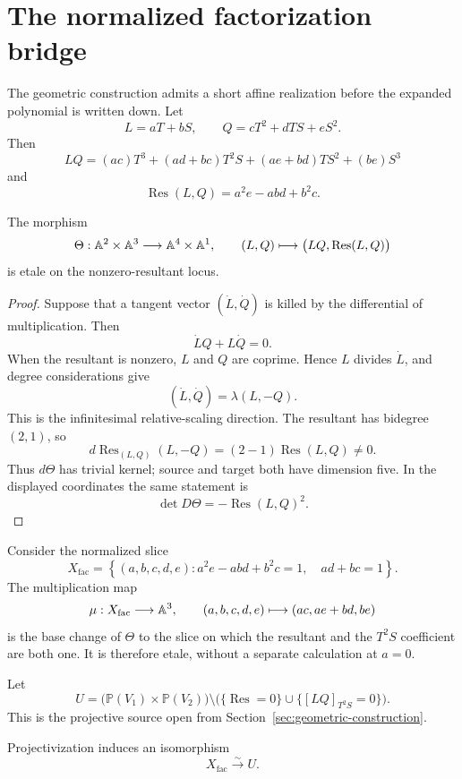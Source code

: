 \section{The normalized factorization bridge}\label{sec:factorization-bridge}

The geometric construction admits a short affine realization before the
expanded polynomial is written down.  Let
\[
 L=aT+bS,
 \qquad
 Q=cT^2+dTS+eS^2.
\]
Then
\[
 LQ=(ac)T^3+(ad+bc)T^2S+(ae+bd)TS^2+(be)S^3
\]
and
\[
 \operatorname{Res}(L,Q)=a^2e-abd+b^2c.
\]

\begin{proposition}
The morphism
\[
 \Theta:\mathbb A^2\times\mathbb A^3\longrightarrow\mathbb A^4\times\mathbb A^1,
 \qquad
 (L,Q)\longmapsto\bigl(LQ,\operatorname{Res}(L,Q)\bigr)
\]
is etale on the nonzero-resultant locus.
\end{proposition}

\begin{proof}
Suppose that a tangent vector $(\dot L,\dot Q)$ is killed by the differential
of multiplication.  Then
\[
 \dot LQ+L\dot Q=0.
\]
When the resultant is nonzero, $L$ and $Q$ are coprime.  Hence $L$ divides
$\dot L$, and degree considerations give
\[
 (\dot L,\dot Q)=\lambda(L,-Q).
\]
This is the infinitesimal relative-scaling direction.  The resultant has
bidegree $(2,1)$, so
\[
 d\operatorname{Res}_{(L,Q)}(L,-Q)
 =(2-1)\operatorname{Res}(L,Q)\ne0.
\]
Thus $d\Theta$ has trivial kernel; source and target both have dimension five.
In the displayed coordinates the same statement is
\[
 \det D\Theta=-\operatorname{Res}(L,Q)^2.
\]
\end{proof}

Consider the normalized slice
\[
 X_{\mathrm{fac}}=
 \left\{(a,b,c,d,e):
 a^2e-abd+b^2c=1,\quad ad+bc=1
 \right\}.
\]
The multiplication map
\begin{equation}\label{eq:factorization-multiplication}
 \mu:X_{\mathrm{fac}}\longrightarrow\mathbb A^3,
 \qquad
 (a,b,c,d,e)\longmapsto(ac,ae+bd,be)
\end{equation}
is the base change of $\Theta$ to the slice on which the resultant and the
$T^2S$ coefficient are both one.  It is therefore etale, without a separate
calculation at $a=0$.

Let
\[
 U=\bigl(\mathbb P(V_1)\times\mathbb P(V_2)\bigr)
 \setminus\bigl(\{\operatorname{Res}=0\}
 \cup\{[LQ]_{T^2S}=0\}\bigr).
\]
This is the projective source open from
Section~\ref{sec:geometric-construction}.

\begin{lemma}\label{lem:unique-factor-normalization}
Projectivization induces an isomorphism
\[
 X_{\mathrm{fac}}\xrightarrow{\sim}U.
\]
\end{lemma}

